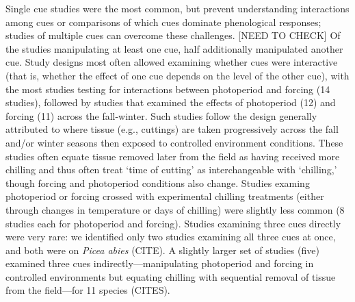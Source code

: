\documentclass[11pt,letter]{article}
\begin{document}
Single cue studies were the most common, but prevent understanding interactions among cues or comparisons of which cues dominate phenological responses; studies of multiple cues can overcome these challenges. [NEED TO CHECK] Of the studies manipulating at least one cue, half additionally manipulated another cue. Study designs most often allowed examining whether cues were interactive (that is, whether the effect of one cue depends on the level of the other cue), with the most studies testing for interactions between photoperiod and forcing (14 studies), followed by studies that examined the effects of photoperiod (12) and forcing (11) across the fall-winter. Such studies follow the design generally attributed to \citet{weinberger1950} where tissue (e.g., cuttings) are taken progressively across the fall and/or winter seasons then exposed to controlled environment conditions. These studies often equate tissue removed later from the field as having received more chilling and thus often treat `time of cutting' as interchangeable with `chilling,' though forcing and photoperiod conditions also change. Studies examing photoperiod or forcing crossed with experimental chilling treatments (either through changes in temperature or days of chilling) were slightly less common (8 studies each for photoperiod and forcing). Studies examining three cues directly were very rare: we identified only two studies examining all three cues at once, and both were on \emph{Picea abies} (CITE). A slightly larger set of studies (five) examined three cues indirectly---manipulating photoperiod and forcing in controlled environments but equating chilling with sequential removal of tissue from the field---for 11 species (CITES). \\
\end{document}
